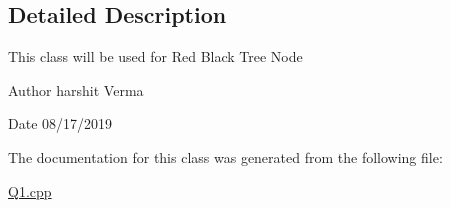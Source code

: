 \subsection{Detailed Description}
This class will be used for Red Black Tree Node \begin{DoxyAuthor}{Author}
harshit Verma 
\end{DoxyAuthor}
\begin{DoxyDate}{Date}
08/17/2019 
\end{DoxyDate}


The documentation for this class was generated from the following file\+:\begin{DoxyCompactItemize}
\item 
\hyperlink{Q1_8cpp}{Q1.\+cpp}\end{DoxyCompactItemize}
